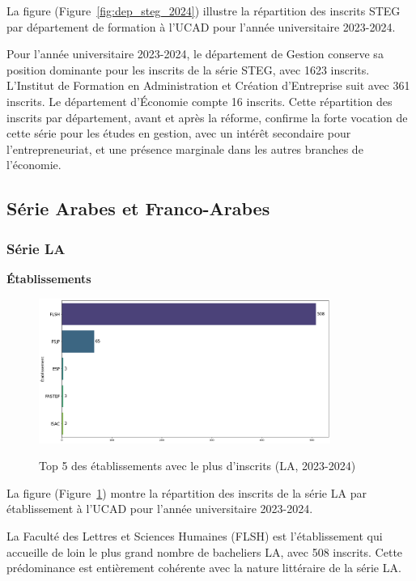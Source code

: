 La figure (Figure~\ref{fig:dep_steg_2024}) illustre la répartition des inscrits STEG par département de formation à l'UCAD pour l'année universitaire 2023-2024.

Pour l'année universitaire 2023-2024, le département de Gestion conserve sa position dominante pour les inscrits de la série STEG, avec 1623 inscrits. L'Institut de Formation en Administration et Création d'Entreprise suit avec 361 inscrits. 
Le département d'Économie compte 16 inscrits. Cette répartition des inscrits par département, avant et après la réforme, confirme la forte vocation de cette série pour les études en gestion, avec un intérêt secondaire pour l'entrepreneuriat, et une présence marginale dans les autres branches de l'économie. 

\subsection{Série Arabes et Franco-Arabes}

\subsubsection{Série LA}

\textbf{Établissements}

\begin{figure}[ht]
\centering
\caption{Top 5 des établissements avec le plus d'inscrits (LA, 2023-2024)}
\includegraphics[width=0.85\textwidth]{figure/etab_LA_2024.png}
\label{fig:etab_la_2024}
\end{figure}

La figure (Figure~\ref{fig:etab_la_2024}) montre la répartition des inscrits de la série LA par établissement à l'UCAD pour l'année universitaire 2023-2024.

La Faculté des Lettres et Sciences Humaines (FLSH) est l'établissement qui accueille de loin le plus grand nombre de bacheliers LA, avec 508 inscrits. 
Cette prédominance est entièrement cohérente avec la nature littéraire de la série LA.

